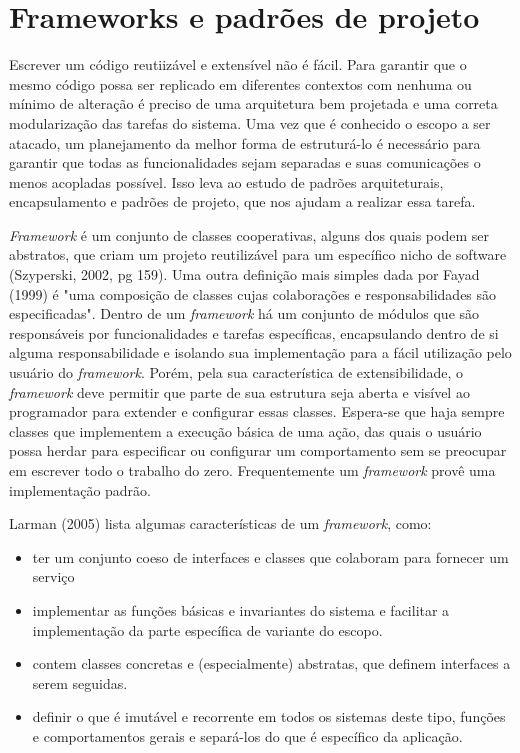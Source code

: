 \section{Frameworks e padrões de projeto}

Escrever um código reutiizável e extensível não é fácil. Para garantir que o mesmo código possa ser replicado em diferentes contextos com nenhuma ou mínimo de alteração é preciso de uma arquitetura bem projetada e uma correta modularização das tarefas do sistema. Uma vez que é conhecido o escopo a ser atacado, um planejamento da melhor forma de estruturá-lo é necessário para garantir que todas as funcionalidades sejam separadas e suas comunicações o menos acopladas possível. Isso leva ao estudo de padrões arquiteturais, encapsulamento e padrões de projeto, que nos ajudam a realizar essa tarefa.

\textit{Framework} é um conjunto de classes cooperativas, alguns dos quais podem ser abstratos, que criam um projeto reutilizável para um específico nicho de software (Szyperski, 2002, pg 159). Uma outra definição mais simples dada por Fayad (1999) é "uma composição de classes cujas colaborações e responsabilidades são especificadas". Dentro de um \textit{framework} há um conjunto de módulos que são responsáveis por funcionalidades e tarefas específicas, encapsulando dentro de si alguma responsabilidade e isolando sua implementação para a fácil utilização pelo usuário do \textit{framework}. Porém, pela sua característica de extensibilidade, o \textit{framework} deve permitir que parte de sua estrutura seja aberta e visível ao programador para extender e configurar essas classes. Espera-se que haja sempre classes que implementem a execução básica de uma ação, das quais o usuário possa herdar para especificar ou configurar um comportamento sem se preocupar em escrever todo o trabalho do zero. Frequentemente um \textit{framework} provê uma implementação padrão.

Larman (2005) lista algumas características de um \textit{framework}, como:
\begin{itemize}
  \item ter um conjunto coeso de interfaces e classes que colaboram para fornecer um serviço
  \item implementar as funções básicas e invariantes do sistema e facilitar a implementação da parte específica de variante do escopo.
  \item contem classes concretas e (especialmente) abstratas, que definem interfaces a serem seguidas.
  \item definir o que é imutável e recorrente em todos os sistemas deste tipo, funções e comportamentos gerais e separá-los do que é específico da aplicação.  
\end{itemize} 

